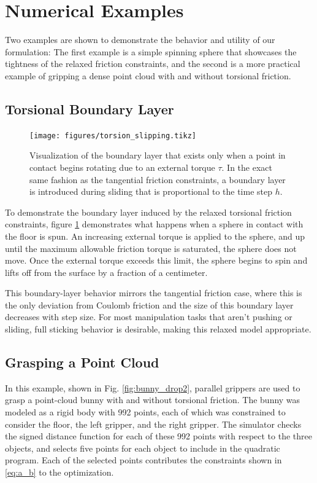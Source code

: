 \section{Numerical Examples}
Two examples are shown to demonstrate the behavior and utility of our formulation: The first example is a simple spinning sphere that showcases the tightness of the relaxed friction constraints, and the second is a more practical example of gripping a dense point cloud with and without torsional friction. 
\subsection{Torsional Boundary Layer}
\begin{figure}
    \centering
    \texttt{[image: figures/torsion\_slipping.tikz]}
    \caption{Visualization of the boundary layer that exists only when a point in contact begins rotating due to an external torque $\tau$. In the exact same fashion as the tangential friction constraints, a boundary layer is introduced during sliding that is proportional to the time step $h$.}
    \label{fig:boundary_layer}
\end{figure}
To demonstrate the boundary layer induced by the relaxed torsional friction constraints, figure \ref{fig:boundary_layer} demonstrates what happens when a sphere in contact with the floor is spun. An increasing external torque is applied to the sphere, and up until the maximum allowable friction torque is saturated, the sphere does not move. Once the external torque exceeds this limit, the sphere begins to spin and lifts off from the surface by a fraction of a centimeter. 

This boundary-layer behavior mirrors the tangential friction case, where this is the only deviation from Coulomb friction and the size of this boundary layer decreases with step size. For most manipulation tasks that aren't pushing or sliding, full sticking behavior is desirable, making this relaxed model appropriate. 

\subsection{Grasping a Point Cloud}
In this example, shown in Fig. \ref{fig:bunny_drop2}, parallel grippers are used to grasp a point-cloud bunny with and without torsional friction. The bunny was modeled as a rigid body with 992 points, each of which was constrained to consider the floor, the left gripper, and the right gripper. The simulator checks the signed distance function for each of these 992 points with respect to the three objects, and selects five points for each object to include in the quadratic program. Each of the selected points contributes the constraints shown in \eqref{eq:a_b} to the optimization. 

